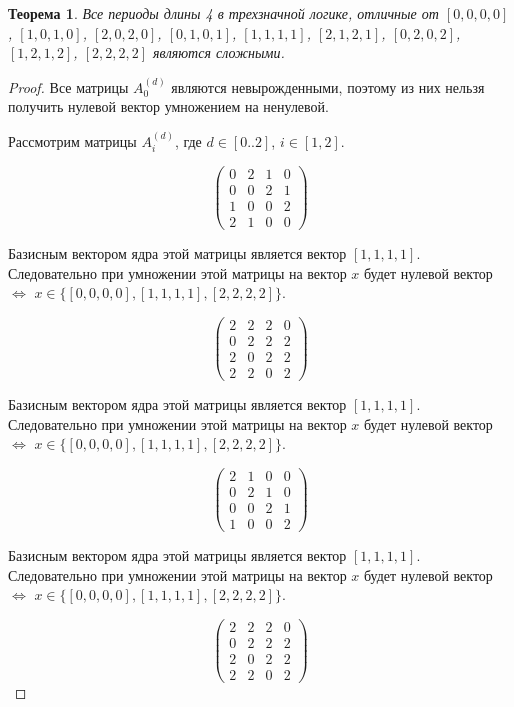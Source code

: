\documentclass[bibliography=totoc, a4paper, 14pt]{extarticle}
\newtheorem{myth}{Теорема}
\begin{document}
\begin{myth}
Все периоды длины 4 в трехзначной логике, отличные от
$[0, 0, 0, 0]$, $[1, 0, 1, 0]$, $[2, 0, 2, 0]$, $[0, 1, 0, 1]$, $[1, 1, 1, 1]$, $[2, 1, 2, 1]$,
$[0, 2, 0, 2]$, $[1, 2, 1, 2]$, $[2, 2, 2, 2]$ являются сложными.
\end{myth}
\begin{proof}
Все матрицы $A_0^{(d)}$ являются невырожденными, поэтому из них нельзя получить нулевой вектор
умножением на ненулевой.

Рассмотрим матрицы $A_i^{(d)}$, где $d \in [0..2]$, $i \in [1,2]$.

$$ \begin{pmatrix}
0 & 2 & 1 & 0 \\
0 & 0 & 2 & 1 \\
1 & 0 & 0 & 2 \\
2 & 1 & 0 & 0
\end{pmatrix} $$

Базисным вектором ядра этой матрицы является вектор $[1, 1, 1, 1]$. Следовательно при умножении этой матрицы на
вектор $x$ будет нулевой вектор $\Leftrightarrow$ $x \in \{[0, 0, 0, 0], [1, 1, 1, 1], [2, 2, 2, 2]\}$.

$$ \begin{pmatrix}
2 & 2 & 2 & 0 \\
0 & 2 & 2 & 2 \\
2 & 0 & 2 & 2 \\
2 & 2 & 0 & 2
\end{pmatrix} $$

Базисным вектором ядра этой матрицы является вектор $[1, 1, 1, 1]$. Следовательно при умножении этой матрицы на
вектор $x$ будет нулевой вектор $\Leftrightarrow$ $x \in \{[0, 0, 0, 0], [1, 1, 1, 1], [2, 2, 2, 2]\}$.

$$ \begin{pmatrix}
2 & 1 & 0 & 0 \\
0 & 2 & 1 & 0 \\
0 & 0 & 2 & 1 \\
1 & 0 & 0 & 2
\end{pmatrix} $$

Базисным вектором ядра этой матрицы является вектор $[1, 1, 1, 1]$. Следовательно при умножении этой матрицы на
вектор $x$ будет нулевой вектор $\Leftrightarrow$ $x \in \{[0, 0, 0, 0], [1, 1, 1, 1], [2, 2, 2, 2]\}$.

$$ \begin{pmatrix}
2 & 2 & 2 & 0 \\
0 & 2 & 2 & 2 \\
2 & 0 & 2 & 2 \\
2 & 2 & 0 & 2
\end{pmatrix} $$


\end{proof}
\end{document}
